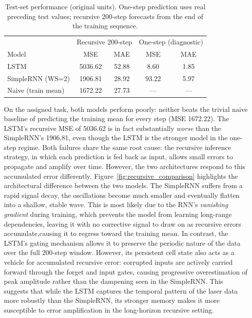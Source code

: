 \documentclass[conference]{IEEEtran}
\begin{document}
\begin{table}[ht]
    \centering
    \caption{Test-set performance (original units). One-step prediction uses real preceding test values; recursive 200-step forecasts from the end of the training sequence.}
    \label{tab:test_metrics}
    \begin{tabular}{lcccc}
        \hline
         & \multicolumn{2}{c}{Recursive 200-step} & \multicolumn{2}{c}{One-step (diagnostic)} \\
        Model & MSE & MAE & MSE & MAE \\
        \hline
        LSTM               & 5036.62 & 52.88 & 8.60  & 1.85 \\
        SimpleRNN (WS=2)   & 1906.81 & 28.92 & 93.22 & 5.97 \\
        Naive (train mean) & 1672.22 & 27.73 & ---   & ---  \\
        \hline
    \end{tabular}
\end{table}
On the assigned task, both models perform poorly: neither beats the trivial naive baseline of predicting the training mean for every step (MSE 1672.22). The LSTM's recursive MSE of 5036.62 is in fact substantially \emph{worse} than the SimpleRNN's 1906.81, even though the LSTM is the stronger model in the one-step regime. Both failures share the same root cause: the recursive inference strategy, in which each prediction is fed back as input, allows small errors to propagate and amplify over time. However, the two architectures respond to this accumulated error differently. Figure~\ref{fig:recursive_comparison} highlights the architectural difference between the two models. The SimpleRNN suffers from a rapid signal decay, the oscillations become much smaller and eventually flatten into a shallow, stable wave. This is most likely due to the RNN's \emph{vanishing gradient} during training, which prevents the model from learning long-range dependencies, leaving it with no corrective signal to draw on as recursive errors accumulate,causing it to regress toward the training mean. In contrast, the LSTM's gating mechanism allows it to preserve the periodic nature of the data over the full 200-step window. However, its persistent cell state also acts as a vehicle for accumulated recursive error: corrupted inputs are actively carried forward through the forget and input gates, causing progressive overestimation of peak amplitude rather than the dampening seen in the SimpleRNN. This suggests that while the LSTM captures the temporal pattern of the laser data more robustly than the SimpleRNN, its stronger memory makes it more susceptible to error amplification in the long-horizon recursive setting.
\end{document}
